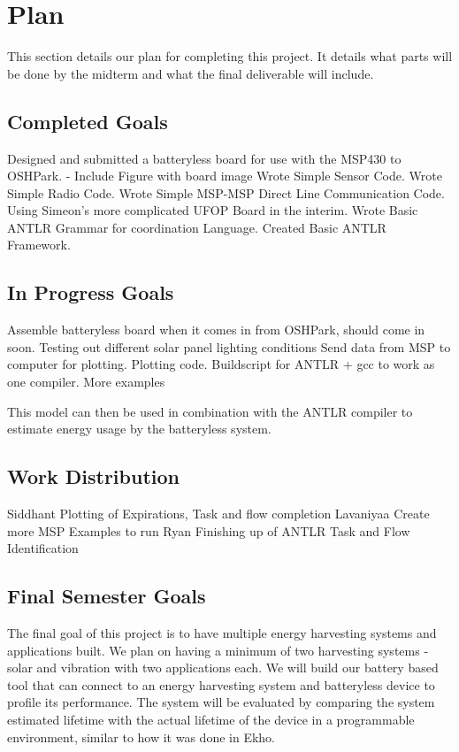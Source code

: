 \section{Plan} %
\label{sec:plan}

This section details our plan for completing this project. It details what parts will be done by the midterm and what the final deliverable will include.

\subsection{Completed Goals}

Designed and submitted a batteryless board for use with the MSP430 to OSHPark.
  - Include Figure with board image
Wrote Simple Sensor Code.
Wrote Simple Radio Code.
Wrote Simple MSP-MSP Direct Line Communication Code.
Using Simeon's more complicated UFOP Board in the interim.
Wrote Basic ANTLR Grammar for coordination Language.
Created Basic ANTLR Framework.


\subsection{In Progress Goals}

Assemble batteryless board when it comes in from OSHPark, should come in soon.
Testing out different solar panel lighting conditions
Send data from MSP to computer for plotting.
Plotting code.
Buildscript for ANTLR + gcc to work as one compiler.
More examples

This model can then be used in combination with the ANTLR compiler to estimate energy usage by the batteryless system.

\subsection{Work Distribution}
Siddhant
Plotting of Expirations, Task and flow completion
Lavaniyaa
Create more MSP Examples to run
Ryan
Finishing up of ANTLR Task and Flow Identification


\subsection{Final Semester Goals}
The final goal of this project is to have multiple energy harvesting systems and applications built.
We plan on having a minimum of two harvesting systems - solar and vibration with two applications each.
We will build our battery based tool that can connect to an energy harvesting system and batteryless device to profile its performance.
The system will be evaluated by comparing the system estimated lifetime with the actual lifetime of the device in a programmable environment, similar to how it was done in Ekho.
